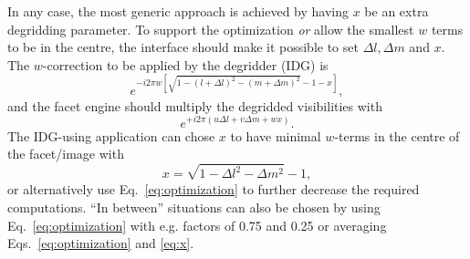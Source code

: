 \documentclass[a4paper,10pt]{article}
\begin{document}
In any case, the most generic approach is achieved by having $x$ be an extra degridding parameter. To support the optimization \textit{or} allow the smallest $w$ terms to be in the centre, the interface should make it possible to set $\Delta l, \Delta m$ and $x$. The $w$-correction to be applied by the degridder (IDG) is
\begin{equation}
 e^{-i2\pi w\left[ \sqrt{1-(l+\Delta l)^2-(m+\Delta m)^2} - 1 - x \right]},
\end{equation}
and the facet engine should multiply the degridded visibilities with
\begin{equation}
e^{+i 2\pi \left(u\Delta l + v\Delta m + wx\right)}.
\end{equation}
The IDG-using application can chose $x$ to have minimal $w$-terms in the centre of the facet/image with
\begin{equation} \label{eq:x}
x = \sqrt{1 - \Delta l^2 - \Delta m^2}-1,
\end{equation}
or alternatively use Eq.~\ref{eq:optimization} to further decrease the required computations. ``In between'' situations can also be chosen by using Eq.~\ref{eq:optimization} with e.g. factors of 0.75 and 0.25 or averaging Eqs.~\ref{eq:optimization} and \ref{eq:x}.
\label{lastpage}
\end{document}
